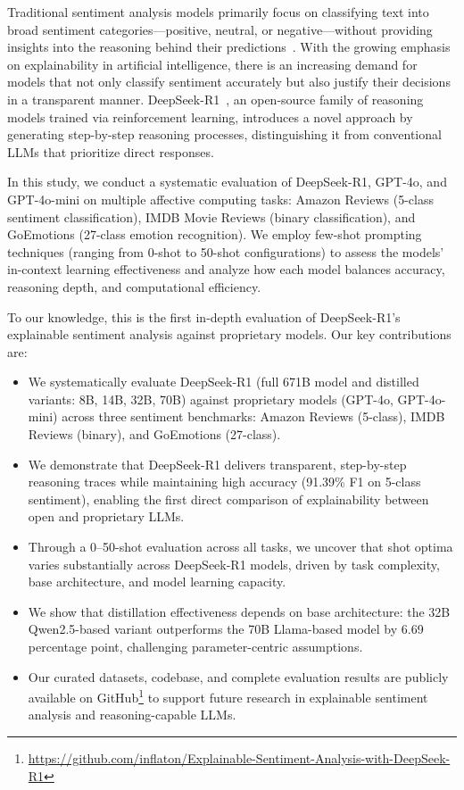 \documentclass{IEEEcsmag}
\begin{document}
Traditional sentiment analysis models primarily focus on classifying text into broad sentiment categories—positive, neutral, or negative—without providing insights into the reasoning behind their predictions~\cite{wang2025review}. With the growing emphasis on explainability in artificial intelligence, there is an increasing demand for models that not only classify sentiment accurately but also justify their decisions in a transparent manner. DeepSeek-R1~\cite{guo2025deepseek}, an open-source family of reasoning models trained via reinforcement learning, introduces a novel approach by generating step-by-step reasoning processes, distinguishing it from conventional LLMs that prioritize direct responses.

In this study, we conduct a systematic evaluation of DeepSeek-R1, GPT-4o, and GPT-4o-mini on multiple affective computing tasks: Amazon Reviews (5-class sentiment classification), IMDB Movie Reviews (binary classification), and GoEmotions (27-class emotion recognition). We employ few-shot prompting techniques (ranging from 0-shot to 50-shot configurations) to assess the models' in-context learning effectiveness and analyze how each model balances accuracy, reasoning depth, and computational efficiency.

To our knowledge, this is the first in-depth evaluation of DeepSeek-R1’s explainable sentiment analysis against proprietary models. Our key contributions are:
\begin{itemize}[itemsep=1pt, topsep=1pt, leftmargin=*]
    \item We systematically evaluate DeepSeek-R1 (full 671B model and distilled variants: 8B, 14B, 32B, 70B) against proprietary models (GPT-4o, GPT-4o-mini) across three sentiment benchmarks: Amazon Reviews (5-class), IMDB Reviews (binary), and GoEmotions (27-class).
    \item We demonstrate that DeepSeek-R1 delivers transparent, step-by-step reasoning traces while maintaining high accuracy (91.39\% F1 on 5-class sentiment), enabling the first direct comparison of explainability between open and proprietary LLMs.
    \item Through a 0--50-shot evaluation across all tasks, we uncover that shot optima varies substantially across DeepSeek-R1 models, driven by task complexity, base architecture, and model learning capacity. 
    
    \item We show that distillation effectiveness depends on base architecture: the 32B Qwen2.5-based variant outperforms the 70B Llama-based model by 6.69 percentage point, challenging parameter-centric assumptions.
    \item Our curated datasets, codebase, and complete evaluation results are publicly available on GitHub\footnote{\url{https://github.com/inflaton/Explainable-Sentiment-Analysis-with-DeepSeek-R1}} to support future research in explainable sentiment analysis and reasoning-capable LLMs.
\end{itemize}
\end{document}
